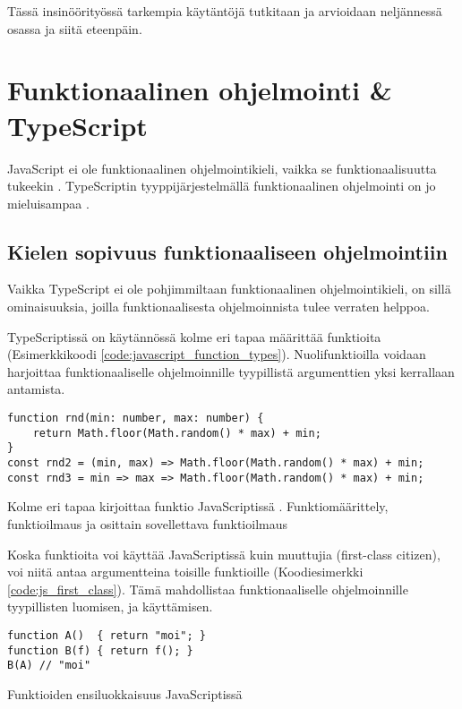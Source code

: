 Tässä insinöörityössä tarkempia käytäntöjä tutkitaan ja arvioidaan neljännessä osassa ja siitä eteenpäin.

\section{Funktionaalinen ohjelmointi \& TypeScript}
JavaScript ei ole funktionaalinen ohjelmointikieli, vaikka se funktionaalisuutta tukeekin \cite{is_reduce_bad}. TypeScriptin tyyppijärjestelmällä funktionaalinen ohjelmointi on jo mieluisampaa \cite{holvikari2021category}.


\subsection{Kielen sopivuus funktionaaliseen ohjelmointiin}

Vaikka TypeScript ei ole pohjimmiltaan funktionaalinen ohjelmointikieli, on sillä ominaisuuksia, joilla funktionaalisesta ohjelmoinnista tulee verraten helppoa.

TypeScriptissä on käytännössä kolme eri tapaa määrittää funktioita (Esimerkkikoodi \ref{code:javascript_function_types}). Nuolifunktioilla voidaan harjoittaa funktionaaliselle ohjelmoinnille tyypillistä argumenttien yksi kerrallaan antamista.


\begin{code}
    \begin{verbatim}
function rnd(min: number, max: number) { 
	return Math.floor(Math.random() * max) + min;
}
const rnd2 = (min, max) => Math.floor(Math.random() * max) + min;
const rnd3 = min => max => Math.floor(Math.random() * max) + min;
\end{verbatim}
    \caption{Kolme eri tapaa kirjoittaa funktio JavaScriptissä \cite{okhravi-g-discussion}. Funktiomäärittely, funktioilmaus ja osittain sovellettava funktioilmaus}
    \label{code:javascript_function_types}
\end{code}

Koska funktioita voi käyttää JavaScriptissä kuin muuttujia (first-class citizen), voi niitä antaa argumentteina toisille funktioille (Koodiesimerkki \ref{code:js_first_class}). Tämä mahdollistaa funktionaaliselle ohjelmoinnille tyypillisten  luomisen, ja käyttämisen.

\begin{code}
    \begin{verbatim}
function A()  { return "moi"; }
function B(f) { return f(); }
B(A) // "moi"
\end{verbatim}
    \caption{Funktioiden ensiluokkaisuus JavaScriptissä}
    \label{code:js_first_class}
\end{code}

